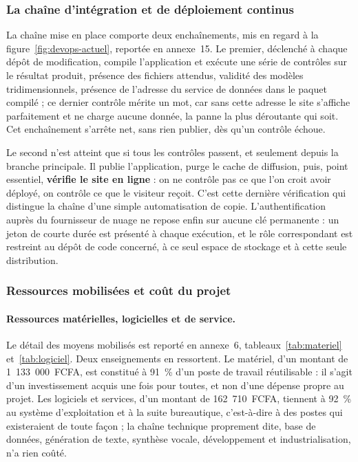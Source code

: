 \subsubsection{La chaîne d'intégration et de déploiement continus}

La chaîne mise en place comporte deux enchaînements, mis en regard à la
figure~\ref{fig:devops-actuel}, reportée en annexe~15. Le premier, déclenché à
chaque dépôt de modification, compile l'application et exécute une série de
contrôles sur le résultat produit, présence des fichiers attendus, validité des
modèles tridimensionnels, présence de l'adresse du service de données dans le
paquet compilé ; ce dernier contrôle mérite un mot, car sans cette adresse le
site s'affiche parfaitement et ne charge aucune donnée, la panne la plus
déroutante qui soit. Cet enchaînement s'arrête net, sans rien publier, dès qu'un
contrôle échoue.

Le second n'est atteint que si tous les contrôles passent, et seulement depuis
la branche principale. Il publie l'application, purge le cache de diffusion,
puis, point essentiel, \textbf{vérifie le site en ligne} : on ne contrôle pas ce
que l'on croit avoir déployé, on contrôle ce que le visiteur reçoit. C'est cette
dernière vérification qui distingue la chaîne d'une simple automatisation de
copie. L'authentification auprès du fournisseur de nuage ne repose enfin sur
aucune clé permanente : un jeton de courte durée est présenté à chaque
exécution, et le rôle correspondant est restreint au dépôt de code concerné, à
ce seul espace de stockage et à cette seule distribution.


\subsubsection{Ressources mobilisées et coût du projet}

\paragraph{Ressources matérielles, logicielles et de service.} Le détail des
moyens mobilisés est reporté en annexe~6, tableaux~\ref{tab:materiel}
et~\ref{tab:logiciel}. Deux enseignements en ressortent. Le matériel, d'un
montant de 1~133~000~FCFA, est constitué à 91~\% d'un poste de travail
réutilisable : il s'agit d'un investissement acquis une fois pour toutes, et non
d'une dépense propre au projet. Les logiciels et services, d'un montant de
162~710~FCFA, tiennent à 92~\% au système d'exploitation et à la suite
bureautique, c'est-à-dire à des postes qui existeraient de toute façon ; la
chaîne technique proprement dite, base de données, génération de texte, synthèse
vocale, développement et industrialisation, n'a rien coûté.


